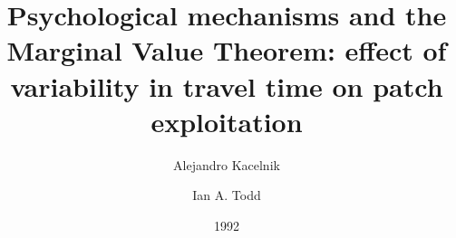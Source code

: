 \documentclass[a4paper,12pt]{article}
\title{Psychological mechanisms and the Marginal Value Theorem: effect of variability in travel time on patch exploitation}
\author{Alejandro Kacelnik \and Ian A. Todd}
\date{1992}
\begin{document}
{\scshape\bfseries \maketitle}
\end{document}
